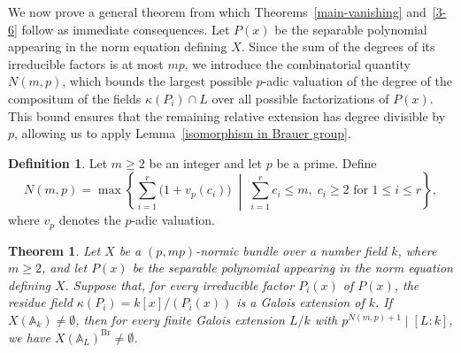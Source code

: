 \documentclass[10pt]{amsart}
\theoremstyle{plain}
\newtheorem{theorem}[thm]{Theorem}
\theoremstyle{definition}
\newtheorem{definition}[thm]{Definition}
\newcommand{\A}{{\mathbb A}}
\newcommand{\Br}{\operatorname{Br}}
\begin{document}
We now prove a general theorem from which Theorems~\ref{main-vanishing} and~\ref{3-6} follow as immediate consequences. Let \(P(x)\) be the separable polynomial appearing in the norm equation defining \(X\). Since the sum of the degrees of its irreducible factors is at most \(mp\), we introduce the combinatorial quantity \(N(m,p)\), which bounds the largest possible \(p\)-adic valuation of the degree of the compositum of the fields \(\kappa(P_i)\cap L\) over all possible factorizations of \(P(x)\). This bound ensures that the remaining relative extension has degree divisible by \(p\), allowing us to apply Lemma~\ref{isomorphism in Brauer group}.

\begin{definition}\label{def:combinatorial-exponent}
Let $m\ge 2$ be an integer and let $p$ be a prime. Define
$$
N(m,p)=
\max\left\{
\sum_{i=1}^r\bigl(1+v_p(c_i)\bigr)
\;\middle|\;
\sum_{i=1}^r c_i\le m,\;
c_i\ge 2
\text{ for }1\le i\le r
\right\},
$$
where $v_p$ denotes the $p$-adic valuation.
\end{definition}




\begin{theorem}\label{generalized-p-mp}
    Let $X$ be a $(p, mp)$-normic bundle over a number field $k$, where $m \geq 2$, and let $P(x)$ be the separable polynomial appearing in the norm equation defining $X$. Suppose that, for every irreducible factor \(P_i(x)\) of \(P(x)\), the residue field
    \(\kappa(P_i)=k[x]/(P_i(x))\) is a Galois extension of \(k\). If $X(\A_k) \neq \emptyset$, then for every finite Galois extension $L/k$ with $p^{N(m,p) + 1} \mid [L:k]$, we have \(X(\A_L)^{\Br} \neq \emptyset\).
\end{theorem}
\end{document}
